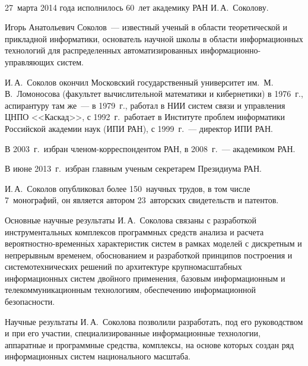       \begin{multicols}{2}


            \begin{center}
\mbox{%
\epsfxsize=78mm
}
\end{center}

\vspace*{6pt}




 27~марта 2014 года исполнилось 60~лет академику РАН И.\,А.~Соколову.

Игорь Анатольевич Соколов~--- известный ученый в области теоретической и
прикладной информатики, основатель научной школы в области информационных
технологий для распределенных\linebreak
 автоматизи\-рованных ин\-фор\-ма\-ци\-он\-но-управ\-ля\-ющих сис\-тем.

И.\,А.~Соколов окончил Московский государственный университет
им.\ М.\,В.~Ломоносова (факультет вычислительной математики и кибернетики) в
1976~г., аспирантуру там же~--- в 1979~г., работал в НИИ систем связи и
управления \mbox{ЦНПО} <<Каскад>>, с 1992~г.\ работает в Институте
проблем информатики
Российской академии наук (ИПИ РАН), с 1999~г.~--- директор ИПИ РАН.

В 2003~г.\ избран членом-корреспондентом РАН, в 2008~г.~--- академиком РАН.

В июне 2013~г.\ избран главным ученым секретарем Президиума РАН.

И.\,А.~Соколов опубликовал более 150~научных трудов, в том числе 7~монографий, он является автором 23~авторских свидетельств и патентов.

Основные научные результаты И.\,А.~Соколова связаны с разработкой инструментальных комплексов программных средств анализа и расчета
вероятностно-временн$\acute{\mbox{ы}}$х характеристик систем в рамках моделей с дискретным и непрерывным временем, обоснованием и разработкой принципов построения и системотехнических решений по архитектуре крупномасштабных информационных систем двойного применения, базовым информационным и телекоммуникационным технологиям, обеспечению информационной безопасности.

Научные результаты И.\,А.~Соколова позволили разработать, под его руководством и при его участии, специализированные информационные технологии, аппаратные и программные средства, комплексы, на основе которых создан ряд информационных систем национального масштаба.


\end{multicols}
